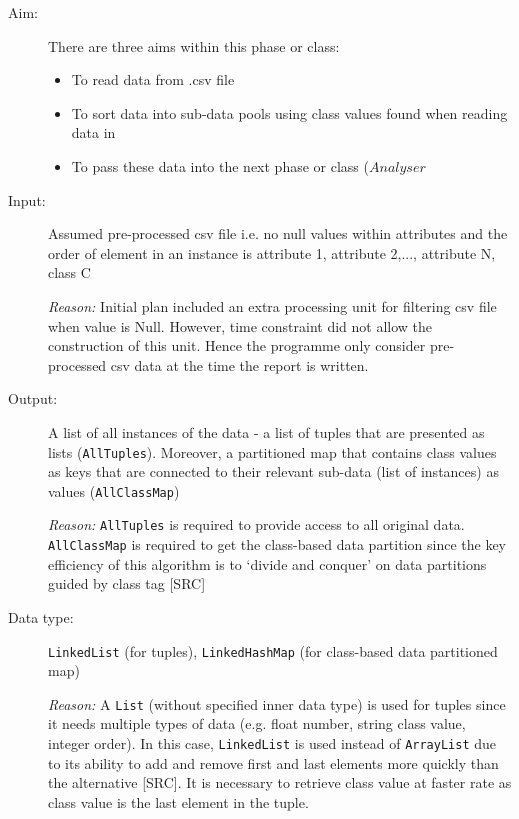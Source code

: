 \begin{description}

\item[Aim: ] There are three aims within this phase or class:
\begin{itemize}
	\item{To read data from .csv file} 
	\item{To sort data into sub-data pools using class values found when reading data in} 
	\item{To pass these data into the next phase or class ($Analyser$} 
\end{itemize}

\item[Input: ] Assumed pre-processed csv file i.e. no null values within attributes and the order of element in an instance is {attribute 1, attribute 2,..., attribute N, class C}

\textit{Reason: } Initial plan included an extra processing unit for filtering csv file when value is Null. However, time constraint did not allow the construction of this unit. Hence the programme only consider pre-processed csv data at the time the report is written.

\item[Output: ] A list of all instances of the data - a list of tuples that are presented as lists (\texttt{AllTuples}). Moreover, a partitioned map that contains class values as keys that are connected to their relevant sub-data (list of instances) as values (\texttt{AllClassMap})
  
\textit{Reason: } \texttt{AllTuples} is required to provide access to all original data. \texttt{AllClassMap} is required to get the class-based data partition since the key efficiency of this algorithm is to `divide and conquer' on data partitions guided by class tag [SRC]

\item[Data type: ] \texttt{LinkedList} (for tuples), \texttt{LinkedHashMap} (for class-based data partitioned map)

\textit{Reason: } A \texttt{List} (without specified inner data type) is used for tuples since it needs multiple types of data (e.g. float number, string class value, integer order). In this case, \texttt{LinkedList} is used instead of \texttt{ArrayList} due to its ability to add and remove first and last elements more quickly than the alternative [SRC]. It is necessary to retrieve class value at faster rate as class value is the last element in the tuple.


\end{description}
